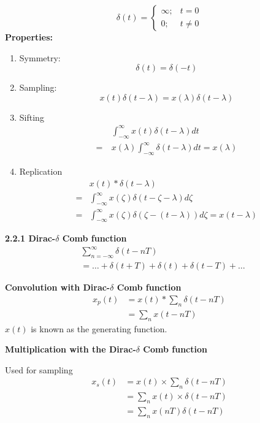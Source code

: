 \documentclass[landscape,a4paper]{extarticle}
\begin{document}
\begin{multicols*}{5}
    \[
        \delta(t)=
        \begin{cases}
            \infty; &t=0\\
            0; &t\neq0
        \end{cases}
    \]
    \textbf{Properties: }
    \begin{enumerate}
        \item Symmetry:
        \[
            \delta(t)=\delta(-t) \tag{2.3}
        \]
        \item Sampling: 
        \[
            x(t)\delta(t-\lambda)=x(\lambda)\delta(t-\lambda) \tag{2.4}
        \]
        \item Sifting
        \begin{align*}
            &\int_{-\infty}^{\infty} x(t)\delta(t-\lambda)dt\\
            =\ &x(\lambda)\int_{-\infty}^{\infty}\delta(t-\lambda)dt=x(\lambda) \tag{2.5}
        \end{align*}
        \item Replication
        \begin{align*}
            &x(t)*\delta(t-\lambda)\\
            =&\int_{-\infty}^{\infty}x(\zeta)\delta(t-\zeta-\lambda)d\zeta\\
            =&\int_{-\infty}^{\infty}x(\zeta)\delta(\zeta-(t-\lambda))d\zeta=x(t-\lambda) \tag{2.6}
        \end{align*}
    \end{enumerate}
    \textbf{2.2.1 Dirac-$\delta$ Comb function}
    \begin{align*}
        &\sum_{n=-\infty}^{\infty}\delta(t-nT)\\
        &= \ldots+\delta(t+T)+\delta(t)+\delta(t-T) + \ldots
    \end{align*}

    \textbf{Convolution with Dirac-$\delta$ Comb function}
    \begin{align*}
        x_p(t)&=x(t)*\sum_n\delta(t-nT)\\
        &=\sum_n x(t-nT)
    \end{align*}
    $x(t)$ is known as the generating function.

    \textbf{Multiplication with the Dirac-$\delta$ Comb function}

    Used for sampling
    \begin{align*}
        x_s(t)&=x(t)\times\sum_n\delta(t-nT)\\
        &=\sum_nx(t)\times\delta(t-nT)\\
        &=\sum_nx(nT)\delta(t-nT)
    \end{align*}
    

\end{multicols*}
\end{document}
